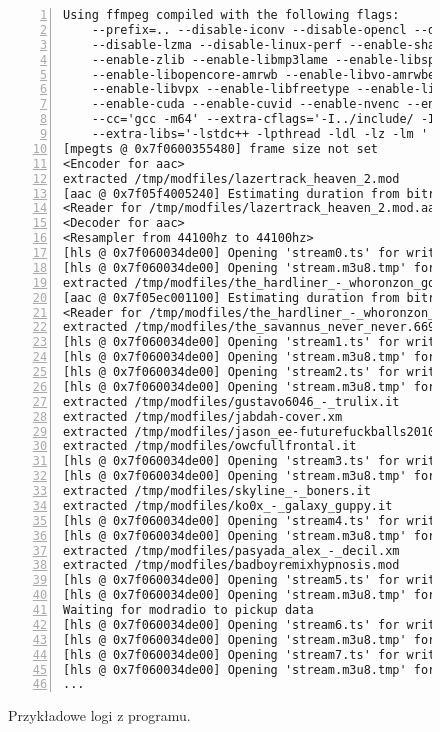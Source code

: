 \documentclass[a4paper,12pt]{article}
\begin{document}
\begin{figure}[t]
\begin{lstlisting}[frame=LB,basicstyle=\ttfamily\scriptsize, numbers=left]
Using ffmpeg compiled with the following flags:
	--prefix=.. --disable-iconv --disable-opencl --disable-sdl2 --disable-bzlib
	--disable-lzma --disable-linux-perf --enable-shared --enable-version3 --enable-runtime-cpudetect
	--enable-zlib --enable-libmp3lame --enable-libspeex --enable-libopencore-amrnb
	--enable-libopencore-amrwb --enable-libvo-amrwbenc --enable-openssl --enable-libopenh264
	--enable-libvpx --enable-libfreetype --enable-libopus --enable-libxml2 --enable-libsrt
	--enable-cuda --enable-cuvid --enable-nvenc --enable-pthreads --enable-libxcb
	--cc='gcc -m64' --extra-cflags='-I../include/ -I../include/libxml2' --extra-ldflags=-L../lib/
	--extra-libs='-lstdc++ -lpthread -ldl -lz -lm '
[mpegts @ 0x7f0600355480] frame size not set
<Encoder for aac>
extracted /tmp/modfiles/lazertrack_heaven_2.mod
[aac @ 0x7f05f4005240] Estimating duration from bitrate, this may be inaccurate
<Reader for /tmp/modfiles/lazertrack_heaven_2.mod.aac>
<Decoder for aac>
<Resampler from 44100hz to 44100hz>
[hls @ 0x7f060034de00] Opening 'stream0.ts' for writing
[hls @ 0x7f060034de00] Opening 'stream.m3u8.tmp' for writing
extracted /tmp/modfiles/the_hardliner_-_whoronzon_gohonzon.xm
[aac @ 0x7f05ec001100] Estimating duration from bitrate, this may be inaccurate
<Reader for /tmp/modfiles/the_hardliner_-_whoronzon_gohonzon.xm.aac>
extracted /tmp/modfiles/the_savannus_never_never.669
[hls @ 0x7f060034de00] Opening 'stream1.ts' for writing
[hls @ 0x7f060034de00] Opening 'stream.m3u8.tmp' for writing
[hls @ 0x7f060034de00] Opening 'stream2.ts' for writing
[hls @ 0x7f060034de00] Opening 'stream.m3u8.tmp' for writing
extracted /tmp/modfiles/gustavo6046_-_trulix.it
extracted /tmp/modfiles/jabdah-cover.xm
extracted /tmp/modfiles/jason_ee-futurefuckballs2010_cover.it
extracted /tmp/modfiles/owcfullfrontal.it
[hls @ 0x7f060034de00] Opening 'stream3.ts' for writing
[hls @ 0x7f060034de00] Opening 'stream.m3u8.tmp' for writing
extracted /tmp/modfiles/skyline_-_boners.it
extracted /tmp/modfiles/ko0x_-_galaxy_guppy.it
[hls @ 0x7f060034de00] Opening 'stream4.ts' for writing
[hls @ 0x7f060034de00] Opening 'stream.m3u8.tmp' for writing
extracted /tmp/modfiles/pasyada_alex_-_decil.xm
extracted /tmp/modfiles/badboyremixhypnosis.mod
[hls @ 0x7f060034de00] Opening 'stream5.ts' for writing
[hls @ 0x7f060034de00] Opening 'stream.m3u8.tmp' for writing
Waiting for modradio to pickup data
[hls @ 0x7f060034de00] Opening 'stream6.ts' for writing
[hls @ 0x7f060034de00] Opening 'stream.m3u8.tmp' for writing
[hls @ 0x7f060034de00] Opening 'stream7.ts' for writing
[hls @ 0x7f060034de00] Opening 'stream.m3u8.tmp' for writing
...
\end{lstlisting}
\centering
    \caption{Przykładowe logi z programu.}
    \label{lst:logs}
\end{figure}
\end{document}
